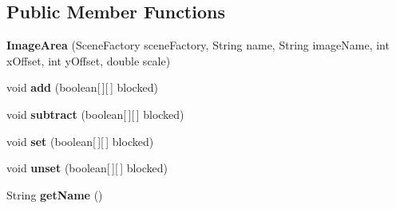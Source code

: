 \subsection*{Public Member Functions}
\begin{DoxyCompactItemize}
\item 
\hypertarget{classdev_1_1boxy_1_1fortyfive_1_1core_1_1areas_1_1_image_area_a715e2ad7e494de8339c3890078758e58}{
{\bfseries ImageArea} (SceneFactory sceneFactory, String name, String imageName, int xOffset, int yOffset, double scale)}
\label{d1/d98/classdev_1_1boxy_1_1fortyfive_1_1core_1_1areas_1_1_image_area_a715e2ad7e494de8339c3890078758e58}

\item 
\hypertarget{classdev_1_1boxy_1_1fortyfive_1_1core_1_1areas_1_1_image_area_af9bc0dfa35da8adfd24022c60ba2f2db}{
void {\bfseries add} (boolean\mbox{[}$\,$\mbox{]}\mbox{[}$\,$\mbox{]} blocked)}
\label{d1/d98/classdev_1_1boxy_1_1fortyfive_1_1core_1_1areas_1_1_image_area_af9bc0dfa35da8adfd24022c60ba2f2db}

\item 
\hypertarget{classdev_1_1boxy_1_1fortyfive_1_1core_1_1areas_1_1_image_area_add06ea355458120e2a6ef96e4313a19f}{
void {\bfseries subtract} (boolean\mbox{[}$\,$\mbox{]}\mbox{[}$\,$\mbox{]} blocked)}
\label{d1/d98/classdev_1_1boxy_1_1fortyfive_1_1core_1_1areas_1_1_image_area_add06ea355458120e2a6ef96e4313a19f}

\item 
\hypertarget{classdev_1_1boxy_1_1fortyfive_1_1core_1_1areas_1_1_image_area_a5f1fe6278250549113c2c1e54d743db3}{
void {\bfseries set} (boolean\mbox{[}$\,$\mbox{]}\mbox{[}$\,$\mbox{]} blocked)}
\label{d1/d98/classdev_1_1boxy_1_1fortyfive_1_1core_1_1areas_1_1_image_area_a5f1fe6278250549113c2c1e54d743db3}

\item 
\hypertarget{classdev_1_1boxy_1_1fortyfive_1_1core_1_1areas_1_1_image_area_ad90c6661c371fb1a1cb5e813a6377e50}{
void {\bfseries unset} (boolean\mbox{[}$\,$\mbox{]}\mbox{[}$\,$\mbox{]} blocked)}
\label{d1/d98/classdev_1_1boxy_1_1fortyfive_1_1core_1_1areas_1_1_image_area_ad90c6661c371fb1a1cb5e813a6377e50}

\item 
\hypertarget{classdev_1_1boxy_1_1fortyfive_1_1core_1_1areas_1_1_image_area_a92e1c6d13582c98377660f0f12e4b12f}{
String {\bfseries getName} ()}
\label{d1/d98/classdev_1_1boxy_1_1fortyfive_1_1core_1_1areas_1_1_image_area_a92e1c6d13582c98377660f0f12e4b12f}


\end{DoxyCompactItemize}
